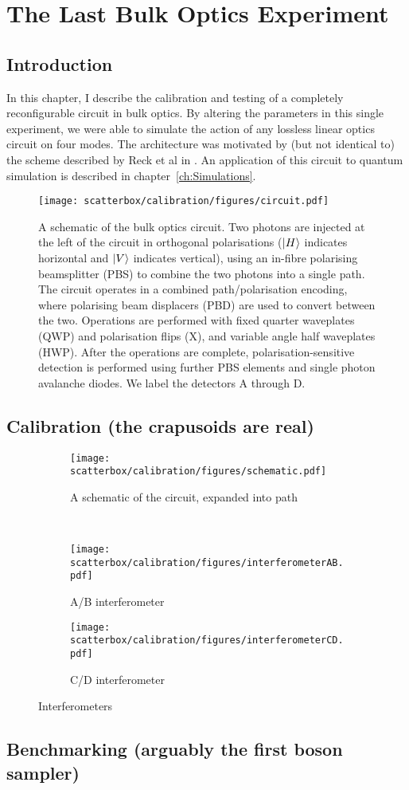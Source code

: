 \chapter{The Last Bulk Optics Experiment}
\label{ch:BulkCircuit}
\section{Introduction}
In this chapter, I describe the calibration and testing of a completely
reconfigurable circuit in bulk optics. By altering the parameters in this single
experiment, we were able to simulate the action of any lossless linear optics
circuit on four modes. The architecture was motivated by (but not identical to)
the scheme described by Reck et al in \cite{reck94}. An application of this
circuit to quantum simulation is described in chapter~\ref{ch:Simulations}.

\begin{figure}
  \centering
  \texttt{[image: scatterbox/calibration/figures/circuit.pdf]}
  \caption{A schematic of the bulk optics circuit. Two photons are injected at
the left of the circuit in orthogonal polarisations (\(\left|H\right\rangle\) indicates
horizontal and \(\left|V\right\rangle\) indicates vertical), using an in-fibre polarising
beamsplitter
(PBS) to combine the two photons into a single path. The circuit operates in a
combined path/polarisation encoding, where polarising beam displacers (PBD) are
used to convert between the two. Operations are performed with fixed quarter
waveplates (QWP) and polarisation flips (X), and variable angle half waveplates
(HWP). After the operations are complete, polarisation-sensitive detection is
performed using further PBS elements and single photon avalanche diodes. We
label the detectors A through D.}
  \label{fig:circuit}
\end{figure}

\section{Calibration (the crapusoids are real)}

\begin{figure}
  \centering
  \begin{subfigure}{\textwidth}
    \texttt{[image: scatterbox/calibration/figures/schematic.pdf]}
    \caption{A schematic of the circuit, expanded into path}
    \label{fig:schematic}
  \end{subfigure} \\
  \vspace{1cm}
  \begin{subfigure}{0.45\textwidth}
    \texttt{[image: scatterbox/calibration/figures/interferometerAB.pdf]}
    \caption{A/B interferometer}
    \label{fig:ab}
  \end{subfigure}
  \hspace{0.05\textwidth}
  \begin{subfigure}{0.45\textwidth}
    \texttt{[image: scatterbox/calibration/figures/interferometerCD.pdf]}
    \caption{C/D interferometer}
    \label{fig:cd}
  \end{subfigure}
  \caption{Interferometers}
  \label{fig:interferometers}
\end{figure}

\section{Benchmarking (arguably the first boson sampler)}
